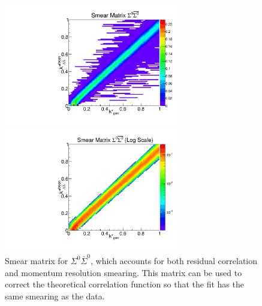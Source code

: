 \begin{figure}[h]
\begin{minipage}{18pc}
\includegraphics[width=18pc]{Figures/SmearMatrices/2016-7-19-SmearMatrixSigmaSigmaNormLA.pdf}
\end{minipage}\hspace{2pc}
\begin{minipage}{18pc}
\includegraphics[width=18pc]{Figures/SmearMatrices/2016-7-19-SmearMatrixSigmaSigmaNormLALog.pdf}
\end{minipage} 
\caption[Smear matrix -- $\Sigma^0\bar{\Sigma}^0$]{
Smear matrix for $\Sigma^0\bar{\Sigma}^0$, which accounts for both residual correlation and momentum resolution smearing. This matrix can be used to correct the theoretical correlation function so that the fit has the same smearing as the data.
}
\end{figure}



